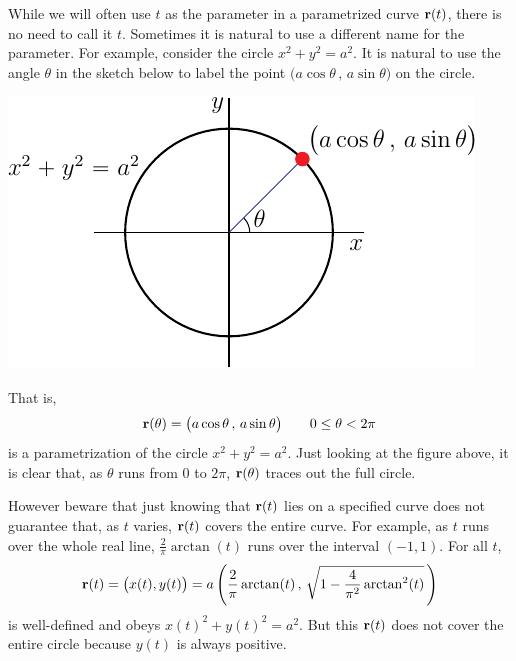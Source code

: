 \begin{eg}[Parametrization of  $x^2+y^2=a^2$]\label{eg:paramCircle}
While we will often use $t$ as the parameter in a parametrized curve $\mathbf{r}(t)$,
there is no need to call it $t$. Sometimes it is natural to use a different 
name for the parameter. For example, consider the circle $x^2+y^2=a^2$.
It is natural to use the angle $\theta$ in the sketch below to label
the point $\big(a\cos\theta\,,\,a\sin\theta\big)$ on the circle. 
\begin{efig}
\begin{center}
     \includegraphics{parCircle.pdf}
\end{center}
\end{efig}
That is,
\begin{equation*}
\mathbf{r}(\theta) = \big(a\cos\theta\,,\,a\sin\theta\big)\qquad
0\le \theta < 2\pi
\end{equation*}
is a parametrization of the circle $x^2+y^2=a^2$. Just looking at the figure above, it is clear that, as $\theta$ runs from $0$ to $2\pi$, $\mathbf{r}(\theta)$
traces out the full circle. 

However beware that just knowing that 
$\mathbf{r}(t)$ lies on a specified curve does not guarantee that, as $t$ varies,
$\mathbf{r}(t)$ covers the entire curve. For example, as $t$ runs over the whole
real line, $\frac{2}{\pi}\arctan(t)$ runs over the interval $(-1,1)$.
For all $t$,
\begin{equation*}
\mathbf{r}(t) = \big(x(t),y(t)\big) 
       = a\left(\frac{2}{\pi}\arctan(t)\,,\,
                \sqrt{1-\frac{4}{\pi^2}\arctan^2(t)}\,\right)
\end{equation*}
is well-defined and obeys $x(t)^2+y(t)^2=a^2$. But this $\mathbf{r}(t)$ does not
cover the entire circle because $y(t)$ is always positive.

\end{eg}

